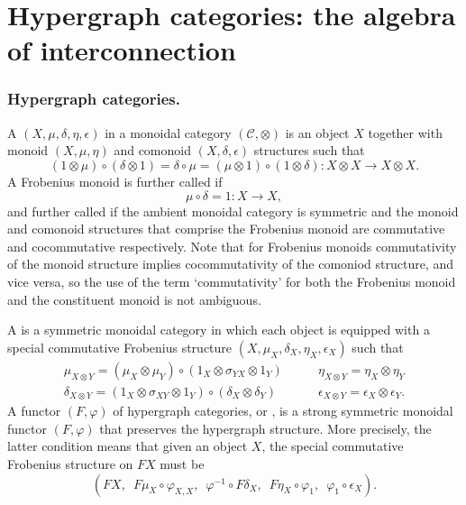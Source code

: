 \chapter{Hypergraph categories: the algebra of interconnection}


\subsection{Hypergraph categories.}

A  $(X,\mu,\delta,\eta,\epsilon)$ in a monoidal
category $(\mathcal C, \otimes)$ is an object $X$ together with monoid $(X,\mu,
\eta)$ and comonoid $(X,\delta,\epsilon)$ structures such that
\[
  (1 \otimes \mu) \circ (\delta \otimes 1) = \delta \circ \mu = (\mu \otimes 1)
  \circ (1 \otimes \delta)\colon  X \otimes X \longrightarrow X \otimes X.
\]
A Frobenius monoid is further called  if 
\[
  \mu \circ \delta = 1\colon  X \longrightarrow X,
\]
and further called  if the ambient monoidal category is symmetric
and the monoid and comonoid structures that comprise the Frobenius monoid are
commutative and cocommutative respectively. Note that for Frobenius monoids
commutativity of the monoid structure implies cocommutativity of the comoniod
structure, and vice versa, so the use of the term `commutativity' for both the
Frobenius monoid and the constituent monoid is not ambiguous.

A  is a
symmetric monoidal category in which each object is equipped with a special
commutative Frobenius structure $(X,\mu_X,\delta_X,\eta_X,\epsilon_X)$ such that 
\[
  \begin{array}{cc}
    \mu_{X\otimes Y} = (\mu_X \otimes \mu_Y)\circ(1_X \otimes \sigma_{YX}\otimes
    1_Y) \qquad&
    \eta_{X\otimes Y} = \eta_X \otimes \eta_Y \\
    \delta_{X\otimes Y} = (1_X \otimes \sigma_{XY}\otimes 1_Y)\circ(\delta_X
    \otimes \delta_Y) \qquad&
    \epsilon_{X\otimes Y} = \epsilon_X \otimes \epsilon_Y.
  \end{array}
\]
A functor $(F,\varphi)$ of hypergraph categories, or , is a strong symmetric monoidal functor $(F,\varphi)$ that preserves
the hypergraph structure. More precisely, the latter condition means that given
an object $X$, the special commutative Frobenius structure on $FX$ must be 
\[
  (FX,\enspace F\mu_X \circ \varphi_{X,X},\enspace  \varphi^{-1} \circ F\delta_X,\enspace  F\eta_X \circ
\varphi_1,\enspace  \varphi_1 \circ \epsilon_X).
\]

